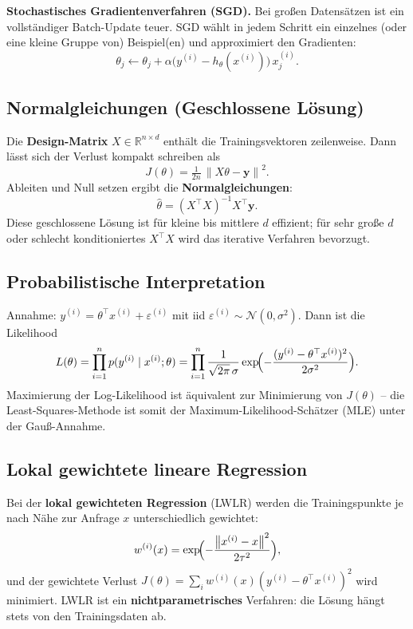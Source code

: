 \documentclass[11pt]{article}
\theoremstyle{csthm}
\theoremstyle{csdef}
\newcommand{\R}{\mathbb{R}}
\newcommand{\N}{\mathcal{N}}
\newcommand{\thetahat}{\hat{\theta}}
\newcommand{\htheta}{h_\theta}
\newcommand{\norm}[1]{\left\|#1\right\|}
\newcommand{\T}{^\top}
\begin{document}
\noindent\textbf{Stochastisches Gradientenverfahren (SGD).} Bei großen
Datensätzen ist ein vollständiger Batch-Update teuer. SGD wählt in jedem
Schritt ein einzelnes (oder eine kleine Gruppe von) Beispiel(en) und
approximiert den Gradienten:
\begin{equation}
  \theta_j \leftarrow \theta_j
    + \alpha \bigl(y^{(i)} - \htheta(x^{(i)})\bigr)\, x_j^{(i)}.
\end{equation}

\subsection{Normalgleichungen (Geschlossene Lösung)}

Die \textbf{Design-Matrix} $X \in \R^{n \times d}$ enthält die
Trainingsvektoren zeilenweise. Dann lässt sich der Verlust kompakt
schreiben als
\begin{equation}
  J(\theta) = \tfrac{1}{2n}\, \norm{X\theta - \bm{y}}^2.
\end{equation}
Ableiten und Null setzen ergibt die \textbf{Normalgleichungen}:
\begin{equation}
  \boxed{\thetahat = (X\T X)^{-1} X\T \bm{y}.}
\end{equation}
Diese geschlossene Lösung ist für kleine bis mittlere $d$ effizient; für
sehr große $d$ oder schlecht konditioniertes $X\T X$ wird das iterative
Verfahren bevorzugt.

\subsection{Probabilistische Interpretation}

Annahme: $y^{(i)} = \theta\T x^{(i)} + \varepsilon^{(i)}$ mit iid
$\varepsilon^{(i)} \sim \N(0, \sigma^2)$. Dann ist die Likelihood
\[
  L(\theta) = \prod_{i=1}^n p(y^{(i)} \mid x^{(i)}; \theta)
  = \prod_{i=1}^n \frac{1}{\sqrt{2\pi}\,\sigma}
    \exp\!\Bigl(-\frac{(y^{(i)} - \theta\T x^{(i)})^2}{2\sigma^2}\Bigr).
\]
Maximierung der Log-Likelihood ist äquivalent zur Minimierung von $J(\theta)$
-- die Least-Squares-Methode ist somit der Maximum-Likelihood-Schätzer (MLE)
unter der Gauß-Annahme.

\subsection{Lokal gewichtete lineare Regression}

Bei der \textbf{lokal gewichteten Regression} (LWLR) werden die
Trainingspunkte je nach Nähe zur Anfrage $x$ unterschiedlich gewichtet:
\begin{equation}
  w^{(i)}(x) = \exp\!\Bigl(-\frac{\norm{x^{(i)} - x}^2}{2\tau^2}\Bigr),
\end{equation}
und der gewichtete Verlust $J(\theta) = \sum_i w^{(i)}(x)(y^{(i)} -
\theta\T x^{(i)})^2$ wird minimiert. LWLR ist ein
\textbf{nichtparametrisches} Verfahren: die Lösung hängt stets von den
Trainingsdaten ab.
\end{document}
